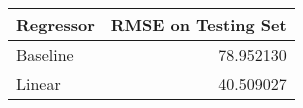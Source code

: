 \begin{tabular}{lr}
\toprule
Regressor &  RMSE on Testing Set \\
\midrule
 Baseline &            78.952130 \\
   Linear &            40.509027 \\
\bottomrule
\end{tabular}
